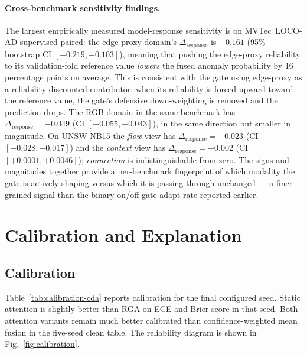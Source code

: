 \documentclass[10pt,conference]{IEEEtran}
\newcommand{\method}{RGA}
\begin{document}
\paragraph{Cross-benchmark sensitivity findings.}
The largest empirically measured model-response sensitivity is on
MVTec~LOCO-AD supervised-paired: the edge-proxy domain's
$\Delta_{\mathrm{response}}$ is $-0.161$ (95\% bootstrap CI
$[-0.219, -0.103]$), meaning that pushing the edge-proxy reliability
to its validation-fold reference value \emph{lowers} the fused
anomaly probability by 16 percentage points on average. This is
consistent with the gate using edge-proxy as a reliability-discounted
contributor: when its reliability is forced upward toward the
reference value, the gate's defensive down-weighting is removed and
the prediction drops. The RGB domain in the same benchmark has
$\Delta_{\mathrm{response}} = -0.049$ (CI $[-0.055,-0.043]$), in the
same direction but smaller in magnitude. On UNSW-NB15 the
\emph{flow} view has $\Delta_{\mathrm{response}} = -0.023$ (CI
$[-0.028,-0.017]$) and the \emph{context} view has
$\Delta_{\mathrm{response}} = +0.002$ (CI $[+0.0001,+0.0046]$);
\emph{connection} is indistinguishable from zero. The signs and
magnitudes together provide a per-benchmark fingerprint of which
modality the gate is actively shaping versus which it is passing
through unchanged --- a finer-grained signal than the binary
on/off gate-adapt rate reported earlier.

\section{Calibration and Explanation}
\subsection{Calibration}
Table~\ref{tab:calibration-cda} reports calibration for the final configured
seed. Static attention is slightly better than \method{} on ECE and Brier score
in that seed. Both attention variants remain much better calibrated than
confidence-weighted mean fusion in the five-seed clean table. The reliability
diagram is shown in Fig.~\ref{fig:calibration}.

\begin{table}[t]
\centering
\caption{Calibration and counterfactual domain-attribution summary.}
\label{tab:calibration-cda}
\footnotesize
\resizebox{\linewidth}{!}{}
\end{table}
\end{document}
